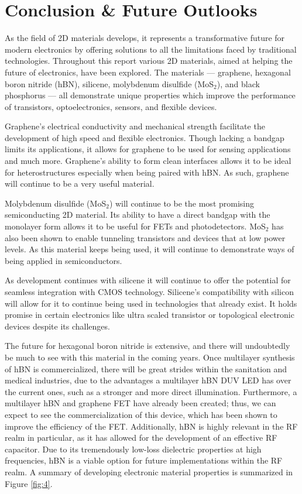 \documentclass[conference]{IEEEtran}
\begin{document}
\section{Conclusion \& Future Outlooks}

As the field of 2D materials develops, it represents a transformative future for modern electronics by offering solutions to all the limitations faced by traditional technologies. Throughout this report various 2D materials, aimed at helping the future of electronics, have been explored. The materials — graphene, hexagonal boron nitride (hBN), silicene, molybdenum disulfide (MoS$_2$), and black phosphorus — all demonstrate unique properties which improve the performance of transistors, optoelectronics, sensors, and flexible devices. 

Graphene’s electrical conductivity and mechanical strength facilitate the development of high speed and flexible electronics. Though lacking a bandgap limits its applications, it allows for graphene to be used for sensing applications and much more. Graphene’s ability to form clean interfaces allows it to be ideal for heterostructures especially when being paired with hBN. As such, graphene will continue to be a very useful material.

Molybdenum disulfide (MoS$_2$) will continue to be the most promising semiconducting 2D material. Its ability to have a direct bandgap with the monolayer form allows it to be useful for FETs and photodetectors. MoS$_2$ has also been shown to enable tunneling transistors and devices that at low power levels. As this material keeps being used, it will continue to demonstrate ways of being applied in semiconductors. 

As development continues with silicene it will continue to offer the potential for seamless integration with CMOS technology. Silicene’s compatibility with silicon will allow for it to continue being used in technologies that already exist. It holds promise in certain electronics like ultra scaled transistor or topological electronic devices despite its challenges.  

The future for hexagonal boron nitride is extensive, and there will undoubtedly be much to see with this material in the coming years. Once multilayer synthesis of hBN is commercialized, there will be great strides within the sanitation and medical industries, due to the advantages a multilayer hBN DUV LED has over the current ones, such as a stronger and more direct illumination. Furthermore, a multilayer hBN and graphene FET have already been created; thus, we can expect to see the commercialization of this device, which has been shown to improve the efficiency of the FET. Additionally, hBN is highly relevant in the RF realm in particular, as it has allowed for the development of an effective RF capacitor. Due to its tremendously low-loss dielectric properties at high frequencies, hBN is a viable option for future implementations within the RF realm. A summary of developing electronic material properties is summarized in Figure \ref{fig:4}.
\end{document}
